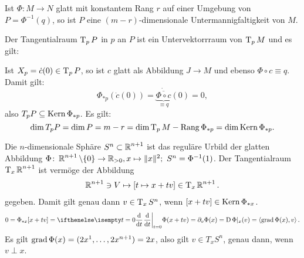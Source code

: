 \begin{bem}
  Ist $\Phi \colon M \to N$ glatt mit konstantem Rang $r$ auf einer Umgebung von $P = \Phi^{-1}(q)$, so ist $P$ eine $(m-r)$-dimensionale Untermannigfaltigkeit von $M$.
  
  Der Tangentialraum $\operatorname{T}_pP$ in $p$ an $P$ ist ein Untervektorrraum von $\operatorname{T}_pM$ und es gilt:
  \begin{center}\end{center}

  Ist $X_p = \dot c(0) \in \operatorname{T}_pP$, so ist $c$ glatt als Abbildung $J \to M$ und ebenso $\Phi \circ c \equiv q$.
  Damit gilt:
    \[ \Phi_{*p}(\dot c(0)) = \dot{\underbrace{\overline{\Phi \circ c}}_{\equiv q}}(0) = 0, \]
  also $T_pP \subseteq \operatorname{Kern} \Phi_{*p}$. Es gilt:
   \[ \dim T_pP = \dim P = m-r = \dim \operatorname{T}_pM - \operatorname{Rang} \Phi_{*p} = \dim \operatorname{Kern} \Phi_{*p}. \]
\end{bem}

\begin{Bsp}
  Die $n$-dimensionale Sphäre $S^n \subset \operatorname{\mathbb{R}}^{n+1}$ ist das reguläre Urbild der glatten Abbildung $\Phi \colon \operatorname{\mathbb{R}}^{n+1}\setminus \{0\} \to \operatorname{\mathbb{R}}_{> 0}, x \mapsto \|x\|^2; \ S^n = \Phi^{-1}(1)$. Der Tangentialraum $\operatorname{T}_x\operatorname{\mathbb{R}}^{n+1}$ ist vermöge der Abbildung
\begin{align*}
  \operatorname{\mathbb{R}}^{n+1} \ni V \mapsto [t \mapsto x + tv] \in \operatorname{T}_x\operatorname{\mathbb{R}}^{n+1}.
\end{align*}
gegeben. Damit gilt genau dann $v \in \operatorname{T}_xS^n$, wenn $[x+tv] \in \operatorname{Kern} \Phi_{*x}$.
\begin{align*}
  0 = \Phi_{*x}[x+tv] = \difffrac[t=0]{}{t} \Phi(x+tv) = \partial_v \Phi(x) = \D \Phi|_x(v) = \left<\grad\Phi(x),v\right>.
\end{align*}
Es gilt $\operatorname{grad} \Phi(x) = (2x^1, \ldots, 2x^{n+1}) = 2x$, also gilt $v \in T_xS^n$, genau dann, wenn $v \perp x$.
\end{Bsp}


